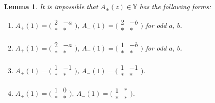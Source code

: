\documentclass[10pt,a4paper]{amsart}
\numberwithin{equation}{section}
\newtheorem{Lemma}[Theorem]{Lemma}
\theoremstyle{definition}
\begin{document}
\begin{Lemma}\label{lemma:ban list}
 It is impossible that $A_\pm(z) \in \mathbb{Y}$ has the following forms:
 \begin{enumerate}\itemsep=0pt
 \item[$(1)$]
 $A_+(1) =
 \bigl(\begin{smallmatrix}
 2 & -a \\
 * & *
 \end{smallmatrix}\bigr)$,
 $A_-(1) =
 \bigl(\begin{smallmatrix}
 2 & -b \\
 * & *
 \end{smallmatrix}\bigr)$ for odd $a$, $b$.
 \item[$(2)$]
 $A_+(1) =
 \bigl(\begin{smallmatrix}
 2 & -a \\
 * & *
 \end{smallmatrix}\bigr)$,
 $A_-(1) =
 \bigl(\begin{smallmatrix}
 1 & -b \\
 * & *
 \end{smallmatrix}\bigr)$ for odd $a$, $b$.
 \item[$(3)$]
 $A_+(1) =
 \bigl(\begin{smallmatrix}
 1 & -1 \\
 * & *
 \end{smallmatrix}\bigr)$,
 $A_-(1) =
 \bigl(\begin{smallmatrix}
 1 & -1 \\
 * & *
 \end{smallmatrix}\bigr)$.
 \item[$(4)$]
 $A_+(1) =
 \bigl(\begin{smallmatrix}
 1 & 0 \\
 * & *
 \end{smallmatrix}\bigr)$,
 $A_-(1) =
 \bigl(\begin{smallmatrix}
 1 & * \\
 * & *
 \end{smallmatrix}\bigr)$.
 \end{enumerate}
\end{Lemma}
\end{document}

